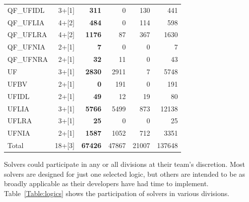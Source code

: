 \documentclass[twoside,11pt]{article}
\begin{document}
\begin{table}
\begin{tabular}{|l|r|r|r|r|r|}
QF\_UFIDL & 3+[1] & {\bf 311} & 0 & 130 & 441\\
QF\_UFLIA & 4+[2] & {\bf 484} & 0 & 114 & 598 \\
QF\_UFLRA & 4+[2] & {\bf 1176} & 87 & 367 & 1630 \\
QF\_UFNIA & 2+[1] & {\bf 7} & 0 &0 & 7 \\
QF\_UFNRA & 2+[1] & {\bf 32} & 11 & 0 & 43\\
UF & 3+[1] & {\bf 2830} & 2911 & 7 & 5748 \\
UFBV & 2+[1] & {\bf 0} & 191 & 0 & 191 \\
UFIDL & 2+[1] & {\bf 49} & 12 & 19 & 80 \\
UFLIA & 3+[1] & {\bf 5766} & 5499 & 873 & 12138 \\
UFLRA & 3+[1] & {\bf 25} & 0 & 0 & 25\\
UFNIA & 2+[1] & {\bf 1587} & 1052 & 712 & 3351 \\
\hline
Total & 18+[3] & {\bf 67426} & 47867 & 21007 & 137648 \\
\hline
\end{tabular}
\end{table}

Solvers could participate in any or all divisions at their team's discretion. Most solvers are designed for just one selected logic, but others are intended to be as broadly applicable as their developers have had time to implement. Table~\ref{Table:logics} shows the participation of solvers in various divisions.
\end{document}

